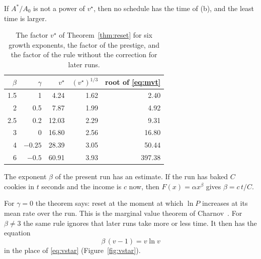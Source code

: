 \documentclass[11pt]{article}
\theoremstyle{boxed}
\begin{document}
If $A^{\ast}/A_0$ is not a power of $v^{\star}$, then no schedule has the time of (b), and the
least time is larger.

\begin{table}[ht]
\centering\small
\begin{tabular}{@{}rrrrr@{}}
\toprule
$\beta$ & $\gamma$ & $v^{\star}$ & $(v^{\star})^{1/3}$ & root of \eqref{eq:mvt} \\
\midrule
1.5 & 1 & 4.24 & 1.62 & 2.40 \\
2 & 0.5 & 7.87 & 1.99 & 4.92 \\
2.5 & 0.2 & 12.03 & 2.29 & 9.31 \\
3 & 0 & 16.80 & 2.56 & 16.80 \\
4 & $-0.25$ & 28.39 & 3.05 & 50.44 \\
6 & $-0.5$ & 60.91 & 3.93 & 397.38 \\
\bottomrule
\end{tabular}
\caption{The factor $v^{\star}$ of Theorem~\ref{thm:reset} for six growth exponents, the factor
of the prestige, and the factor of the rule without the correction for later
runs.}\label{tab:vstar}
\end{table}

The exponent $\beta$ of the present run has an estimate. If the run has baked $C$ cookies in
$t$ seconds and the income is $c$ now, then $F(x)=\alpha x^{\beta}$ gives $\beta=c\,t/C$.

For $\gamma=0$ the theorem says: reset at the moment at which $\ln P$ increases at its mean rate
over the run. This is the marginal value theorem of Charnov~\cite{Charnov}. For
$\beta\ne3$ the same rule ignores that later runs take more or less time. It then has the
equation
\begin{equation}\label{eq:mvt}
  \beta\,(v-1)=v\ln v
\end{equation}
in the place of \eqref{eq:vstar} (Figure~\ref{fig:vstar}).
\end{document}
